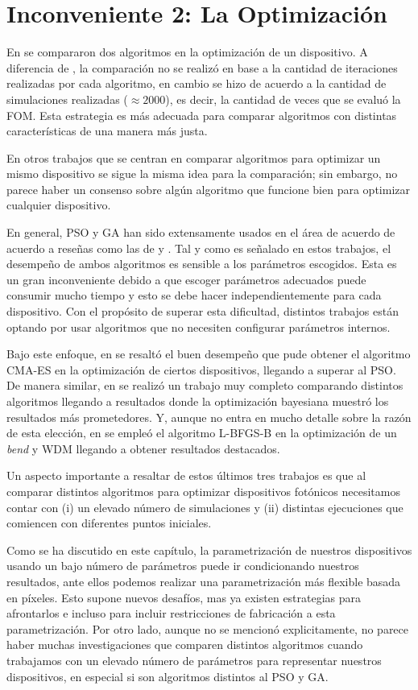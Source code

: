\section{Inconveniente 2: La Optimización}

En \cite{Malheiros-Silveira2020} se compararon dos algoritmos en la optimización de un dispositivo.
A diferencia de \cite{Prosopio-Galarza2019}, la comparación no se realizó en base a la cantidad de iteraciones
realizadas por cada algoritmo, en cambio se hizo de acuerdo a la cantidad de simulaciones realizadas 
($\approx 2000$), es decir, la cantidad de veces que se evaluó la FOM. 
Esta estrategia es más adecuada para comparar algoritmos con distintas características de una manera más justa.


En otros trabajos que se centran en comparar algoritmos para optimizar un mismo dispositivo se sigue la misma
idea para la comparación; sin embargo, no parece haber un consenso sobre algún algoritmo que funcione bien
para optimizar cualquier dispositivo.


En general, PSO y GA han sido extensamente usados en el área de acuerdo de acuerdo a reseñas como las de
\cite{Elsawy2020} y \cite{Campbell2019}. Tal y como es señalado en estos trabajos, el desempeño de ambos
algoritmos es sensible a los parámetros escogidos. Esta es un gran inconveniente debido a que escoger
parámetros adecuados puede consumir mucho tiempo y esto se debe hacer independientemente para cada
dispositivo. Con el propósito de superar esta dificultad, distintos trabajos están optando por usar algoritmos
que no necesiten configurar parámetros internos.


Bajo este enfoque, en \cite{Gregory2015} se resaltó el buen desempeño que pude obtener el algoritmo CMA-ES en
la optimización de ciertos dispositivos, llegando a superar al PSO.
De manera similar, en \cite{Schneider2019} se realizó un trabajo muy completo comparando distintos algoritmos
llegando a resultados donde la optimización bayesiana muestró los resultados más prometedores.
Y, aunque no entra en mucho detalle sobre la razón de esta elección, en \cite{Su2020} se empleó el algoritmo 
L-BFGS-B en la optimización de un \emph{bend} y WDM llegando a obtener resultados destacados.

Un aspecto importante a resaltar de estos últimos tres trabajos es que al comparar distintos algoritmos para
optimizar dispositivos fotónicos necesitamos contar con
(i) un elevado número de simulaciones y
(ii) distintas ejecuciones que comiencen con diferentes puntos iniciales.

Como se ha discutido en este capítulo, la parametrización de nuestros dispositivos usando un bajo número
de parámetros puede ir condicionando nuestros resultados, ante ellos podemos realizar una parametrización
más flexible basada en píxeles. Esto supone nuevos desafíos, mas ya existen estrategias para afrontarlos e
incluso para incluir restricciones de fabricación a esta parametrización.
Por otro lado, aunque no se mencionó explicitamente, no parece haber muchas
investigaciones que comparen distintos algoritmos cuando trabajamos con un elevado número de parámetros para
representar nuestros dispositivos, en especial si son algoritmos distintos al PSO y GA.
